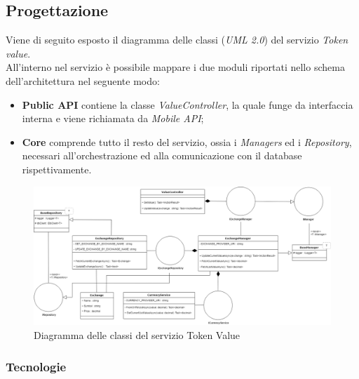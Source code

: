 \documentclass[11pt]{thesistemp}
\begin{document}
\subsection{Progettazione}
Viene di seguito esposto il diagramma delle classi (\textit{UML 2.0}) del servizio \textit{Token value}.\\
All'interno nel servizio è possibile mappare i due moduli riportati nello schema dell'architettura nel seguente modo:
\begin{itemize}
	\item \textbf{Public API} contiene la classe \textit{ValueController}, la quale funge da interfaccia interna e viene richiamata da \textit{Mobile API};
	\item \textbf{Core} comprende tutto il resto del servizio, ossia i \textit{Managers} ed i \textit{Repository}, necessari all'orchestrazione ed alla comunicazione con il database rispettivamente.
\end{itemize}
\begin{figure}[h]\hfill
    \centering
    \includegraphics[width=\textwidth]{TkUMLClassDiagram.png}
        \caption{Diagramma delle classi del servizio Token Value}
    \label{fig:TkUMLClassDiagram}
\end{figure}

\subsubsection{Tecnologie}
\end{document}
